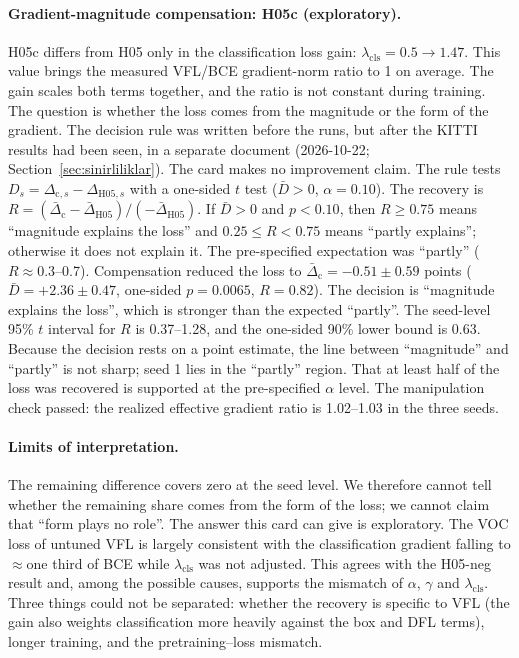 \documentclass[pdflatex,iicol,sn-mathphys-num]{sn-jnl}
\begin{document}
\paragraph{Gradient-magnitude compensation: H05c (exploratory).}
H05c differs from H05 only in the classification loss gain: $\lambda_{\mathrm{cls}}=0.5\to1.47$. This value brings the measured VFL/BCE gradient-norm ratio to 1 on average. The gain scales both terms together, and the ratio is not constant during training. The question is whether the loss comes from the magnitude or the form of the gradient. The decision rule was written before the runs, but after the KITTI results had been seen, in a separate document (2026-10-22; Section~\ref{sec:sinirliliklar}). The card makes no improvement claim. The rule tests $D_s=\Delta_{\mathrm{c},s}-\Delta_{\mathrm{H05},s}$ with a one-sided $t$ test ($\bar D>0$, $\alpha=0.10$). The recovery is $R=(\bar\Delta_{\mathrm{c}}-\bar\Delta_{\mathrm{H05}})/(-\bar\Delta_{\mathrm{H05}})$. If $\bar D>0$ and $p<0.10$, then $R\ge0.75$ means ``magnitude explains the loss'' and $0.25\le R<0.75$ means ``partly explains''; otherwise it does not explain it. The pre-specified expectation was ``partly'' ($R\approx0.3$--0.7). Compensation reduced the loss to $\bar\Delta_{\mathrm{c}}=-0.51\pm0.59$ points ($\bar D=+2.36\pm0.47$, one-sided $p=0.0065$, $R=0.82$). The decision is ``magnitude explains the loss'', which is stronger than the expected ``partly''. The seed-level 95\% $t$ interval for $R$ is 0.37--1.28, and the one-sided 90\% lower bound is 0.63. Because the decision rests on a point estimate, the line between ``magnitude'' and ``partly'' is not sharp; seed 1 lies in the ``partly'' region. That at least half of the loss was recovered is supported at the pre-specified $\alpha$ level. The manipulation check passed: the realized effective gradient ratio is 1.02--1.03 in the three seeds.

\paragraph{Limits of interpretation.}
The remaining difference covers zero at the seed level. We therefore cannot tell whether the remaining share comes from the form of the loss; we cannot claim that ``form plays no role''. The answer this card can give is exploratory. The VOC loss of untuned VFL is largely consistent with the classification gradient falling to $\approx$one third of BCE while $\lambda_{\mathrm{cls}}$ was not adjusted. This agrees with the H05-neg result and, among the possible causes, supports the mismatch of $\alpha$, $\gamma$ and $\lambda_{\mathrm{cls}}$. Three things could not be separated: whether the recovery is specific to VFL (the gain also weights classification more heavily against the box and DFL terms), longer training, and the pretraining--loss mismatch.
\end{document}
